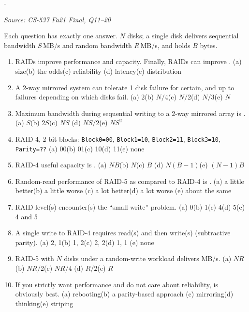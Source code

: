\documentclass[11pt,a4paper]{article}
\makeatletter
\newcommand{\keepspace}[1]{\par\penalty-100\begingroup
  \setlength{\dimen@}{#1}\dimen@ii\pagegoal\advance\dimen@ii-\pagetotal
  \ifdim\dimen@>\dimen@ii\ifdim\dimen@ii>\z@\vfil\fi\break\fi\endgroup}
\newcounter{qn}[section]
\newenvironment{Qn}[4]{%
  \refstepcounter{qn}\keepspace{7\baselineskip}%
  \begin{tcolorbox}[qboxstyle, title={Q\thesection.\theqn\ \ [#1 \textbar\ #2]\ \ #4}]%
  {\footnotesize\color{g3}\textit{Source: #3}}\par\smallskip%
}{%
  \end{tcolorbox}%
}
\makeatother
\begin{document}
\begin{Qn}{Easy-Medium}{Lect 22A}{CS-537 Fa21 Final, Q11--20}{RAID fill-in: capacity, mirroring, small write, throughput}
Each question has exactly one answer. $N$ disks; a single disk delivers
sequential bandwidth $S$\,MB/s and random bandwidth $R$\,MB/s, and
holds $B$ bytes.
\begin{enumerate}
\item[11.] RAIDs improve performance and capacity. Finally, RAIDs can
      improve \underline{\hspace{1.2cm}}.
      (a) size\quad (b) the odds\quad (c) reliability\quad
      (d) latency\quad (e) distribution
\item[12.] A 2-way mirrored system can tolerate 1 disk failure for
      certain, and up to \underline{\hspace{1.2cm}} failures depending
      on which disks fail.
      (a) 2\quad (b) $N/4$\quad (c) $N/2$\quad (d) $N/3$\quad (e) $N$
\item[13.] Maximum bandwidth during sequential writing to a 2-way
      mirrored array is \underline{\hspace{1.2cm}}.
      (a) $S$\quad (b) $2S$\quad (c) $NS$\quad
      (d) $NS/2$\quad (e) $NS^{2}$
\item[14.] RAID-4, 2-bit blocks:
      \texttt{Block0=00}, \texttt{Block1=10}, \texttt{Block2=11},
      \texttt{Block3=10}, \texttt{Parity=??}
      (a) 00\quad (b) 01\quad (c) 10\quad (d) 11\quad (e) none
\item[15.] RAID-4 useful capacity is \underline{\hspace{1.2cm}}.
      (a) $N B$\quad (b) $N$\quad (c) $B$\quad
      (d) $N(B-1)$\quad (e) $(N-1)B$
\item[16.] Random-read performance of RAID-5 as compared to RAID-4 is
      \underline{\hspace{1.2cm}}.
      (a) a little better\quad (b) a little worse\quad
      (c) a lot better\quad (d) a lot worse\quad
      (e) about the same
\item[17.] RAID level(s) \underline{\hspace{1.2cm}} encounter(s) the
      ``small write'' problem.
      (a) 0\quad (b) 1\quad (c) 4\quad (d) 5\quad (e) 4 and 5
\item[18.] A single write to RAID-4 requires \underline{\hspace{0.8cm}}
      read(s) and then \underline{\hspace{0.8cm}} write(s) (subtractive
      parity).
      (a) 2, 1\quad (b) 1, 2\quad (c) 2, 2\quad (d) 1, 1\quad
      (e) none
\item[19.] RAID-5 with $N$ disks under a random-write workload delivers
      \underline{\hspace{1.2cm}} MB/s.
      (a) $NR$\quad (b) $NR/2$\quad (c) $NR/4$\quad
      (d) $R/2$\quad (e) $R$
\item[20.] If you strictly want performance and do not care about
      reliability, \underline{\hspace{1.2cm}} is obviously best.
      (a) rebooting\quad (b) a parity-based approach\quad
      (c) mirroring\quad (d) thinking\quad (e) striping
\end{enumerate}
\end{Qn}
\end{document}
